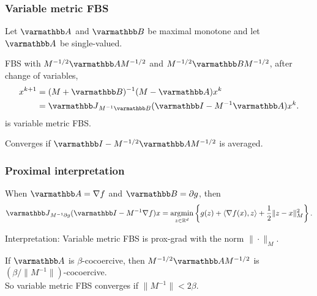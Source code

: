 \documentclass[10pt,mathserif]{beamer}
\begin{document}
\begin{frame}
\frametitle{Variable metric FBS}
Let $\opA $ and $\opB $ be maximal monotone and let $\opA $ be single-valued.

\vspace{0.2in}
FBS with $M^{-1/2}\opA M^{-1/2}$ and $M^{-1/2}\opB  M^{-1/2}$,
after change of variables,
\begin{align*}
x^{k+1}
&=
(M+ \opB )^{-1}
(M - \opA )x^k\\
&=\opJ_{M^{-1}\opB }
(\opI - M^{-1} \opA )x^k.
\end{align*}
is variable metric FBS.

\vspace{0.2in}

Converges if $\opI -M^{-1/2}\opA M^{-1/2}$ is averaged.
\end{frame}



\begin{frame}
\frametitle{Proximal interpretation}
When $\opA =\nabla f$ and $\opB =\partial g$, then
\[
\opJ_{M^{-1}\partial g}
(\opI - M^{-1} \nabla f)x
=
\argmin_{z\in \reals^d}\left\{g(z)+
\langle \nabla f(x),z\rangle +
\frac{1}{2}
\|z-x\|^2_M
\right\}.
\]
\vspace{0.2in}

Interpretation: Variable metric FBS is prox-grad with the norm $\|\cdot\|_M$.

\vspace{0.2in}

If $\opA$ is $\beta$-cocoercive, then $M^{-1/2}\opA M^{-1/2}$ is $(\beta/\|M^{-1}\|)$-cocoercive.\\
So variable metric FBS converges if $\|M^{-1}\|<2\beta$.
\end{frame}

\end{document}
